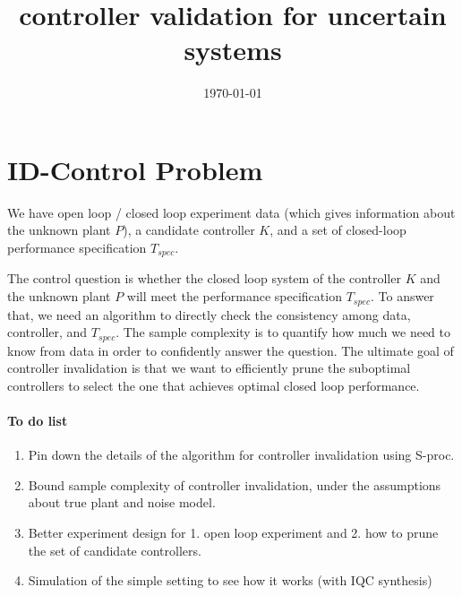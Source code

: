 \documentclass[11pt, onecolumn]{article}
\theoremstyle{plain}
\theoremstyle{plain}
\theoremstyle{definition}
\begin{document}
\title{controller validation for uncertain systems}
\date{\today}



\setcounter{page}{1}


\section{ID-Control Problem}

We have open loop / closed loop experiment data (which gives information about the unknown plant $P$), a
candidate controller $K$, and a set of closed-loop performance specification $T_{spec}$.

The control question is whether the closed loop system of the controller $K$ and the unknown plant
$P$ will meet the performance specification $T_{spec}$.
%
To answer that, we need an algorithm to directly check the consistency among data, controller, and
$T_{spec}$.
%
The sample complexity is to quantify how much we need to know from data in order to confidently
answer the question.
%
The ultimate goal of controller invalidation is that we want to efficiently prune the suboptimal
controllers to select the one that achieves optimal closed loop performance.

\paragraph{To do list }
\begin{enumerate}
\item Pin down the details of the algorithm for controller invalidation using S-proc.
\item Bound sample complexity of controller invalidation, under the assumptions about true plant and noise
  model.
\item Better experiment design for 1. open loop experiment and 2. how to prune the set of candidate controllers.
\item Simulation of the simple setting to see how it works (with IQC synthesis)
\end{enumerate}
\end{document}
